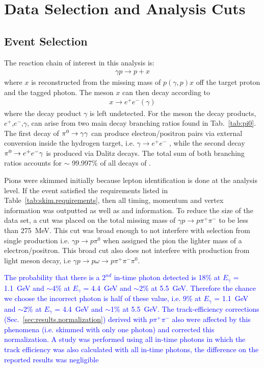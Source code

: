 \section{Data Selection and Analysis Cuts}\label{sec:evnt}
\subsection{Event Selection}\label{subsec:evnt}
	The reaction chain of interest in this analysis is:
	\begin{align}
	\gamma p \rightarrow p + x
	\end{align}
	where $x$ is reconstructed from the missing mass of $p(\gamma,p)x$ off the target proton and the tagged photon. The meson $x$ can then decay according to  
	\begin{align}
	x\rightarrow e^{+}e^{-}(\gamma)
	\end{align}
	where the decay product $\gamma$ is left undetected. For the \pizT meson the decay products, $e^+$,$e^-$,$\gamma$, can arise from two main decay branching ratios found in Tab.~\ref{tab:pi0}. The first decay of $\pi^{0}\rightarrow\gamma\gamma$ can produce electron/positron pairs via external conversion inside the hydrogen target, i.e. $\gamma\rightarrow e^+e^-$ , while the second decay $\pi^{0}\rightarrow e^+e^-\gamma$ is produced via Dalitz decays. The total sum of both branching ratios accounts for $\sim$ 99.997\% of all decays of \pizT.
	
	\FloatBarrier
	Pions were skimmed initially because lepton identification is done at the analysis level. If the event satisfied the requirements listed in Table~\ref{tab:skim.requirements}, then all timing, momentum and vertex information was 
	outputted as well as  and  information. To reduce the size of the data set, a cut 
	was placed on the total missing mass of $\gamma p \to p \pi^{+} \pi^{-}$ to be less than 275~MeV. This cut was broad enough to not interfere with \pizT selection from single 
	\pizT production i.e. $\gamma p \to p \pi^{0}$ when assigned the pion the lighter mass of a electron/positron. This broad cut also does not interfere with \pizT production from 
	light meson decay, i.e $\gamma p \to p \omega \to p \pi^{+} \pi^{-} \pi^{0}$. 
		
	
	\textcolor{blue}{The probability that there is a $2^{nd}$ in-time photon detected is 18\% at $E_\gamma$ = 1.1~GeV and $\sim$4\% at $E_\gamma$ = 4.4~GeV and $\sim$2\% at 5.5~GeV. Therefore the chance we choose the incorrect photon is half of these value, i.e. 9\% at $E_\gamma$ = 1.1~GeV and $\sim$2\% at $E_\gamma$ = 4.4~GeV and $\sim$1\% at 5.5~GeV. The track-efficiency corrections (Sec.~\ref{sec:results.normalization}) derived with $p\pi^+\pi^-$ also were affected by this phenomena (i.e. skimmed with only one photon) and corrected this normalization. A study was performed using all in-time photons in which the track efficiency was also calculated with all in-time photons, the difference on the reported results was negligible}
	\FloatBarrier
